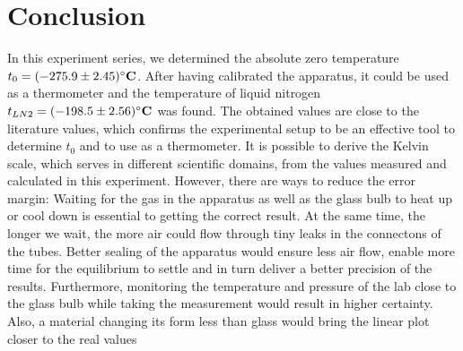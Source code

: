 \section{Conclusion}
    In this experiment series, we determined the absolute zero temperature $t_0 = (-275.9 \pm 2.45)\si{\bf\celsius}$.
    After having calibrated the apparatus, it could be used as a thermometer and the temperature of liquid nitrogen $t_{LN2} = (-198.5 \pm 2.56)\si{\bf\celsius}$ was found.
    The obtained values are close to the literature values, which confirms the experimental setup to be an effective tool to determine $t_0$ and to use as a thermometer.
    It is possible to derive the Kelvin scale, which serves in different scientific domains, from the values measured and calculated in this experiment.
    However, there are ways to reduce the error margin:
    Waiting for the gas in the apparatus as well as the glass bulb to heat up or cool down is essential to getting the correct result.
    At the same time, the longer we wait, the more air could flow through tiny leaks in the connectons of the tubes.
    Better sealing of the apparatus would ensure less air flow, enable more time for the equilibrium to settle and in turn deliver a better precision of the results.
    Furthermore, monitoring the temperature and pressure of the lab close to the glass bulb while taking the measurement would result in higher certainty.
    Also, a material changing its form less than glass would bring the linear plot closer to the real values

